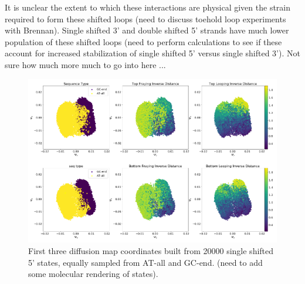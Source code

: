 \documentclass[journal=jpcbfk,manuscript=article]{achemso}
\begin{document}
It is unclear the extent to which these interactions are physical given the strain required to form these shifted loops (need to discuss toehold loop experiments with Brennan).  Single shifted 3' and double shifted 5' strands have much lower population of these shifted loops (need to perform calculations to see if these account for increased stabilization of single shifted 5' versus single shifted 3'). Not sure how much more much to go into here ...

\begin{figure}[ht!]
	\begin{center}
        \includegraphics[width=\textwidth]{Figs/figs_0804/diff_maps_full.png}
        \caption{First three diffusion map coordinates built from 20000 single shifted 5' states, equally sampled from AT-all and GC-end. (need to add some molecular rendering of states).}
        \label{fig:shifting_distributions}
	\end{center}
\end{figure}
\end{document}
